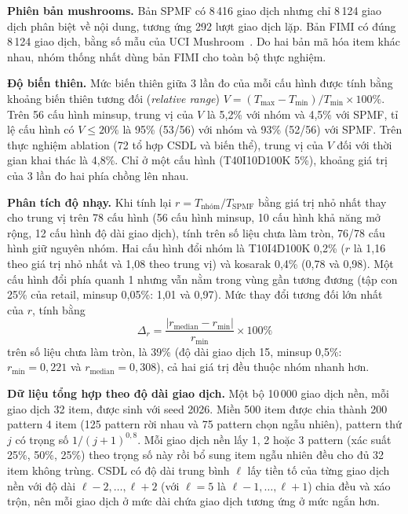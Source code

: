 \textbf{Phiên bản mushrooms.} Bản SPMF có 8\,416 giao dịch nhưng chỉ 8\,124 giao dịch phân biệt về nội dung, tương
ứng 292 lượt giao dịch lặp. Bản FIMI có đúng 8\,124 giao dịch, bằng số mẫu của UCI Mushroom~\cite{uci_mushroom}. Do
hai bản mã hóa item khác nhau, nhóm thống nhất dùng bản FIMI cho toàn bộ thực nghiệm.

\textbf{Độ biến thiên.} Mức biến thiên giữa 3 lần đo của mỗi cấu hình được tính bằng khoảng biến thiên tương đối
(\textit{relative range}) $V=(T_{\max}-T_{\min})/T_{\min}\times 100\%$. Trên 56 cấu hình minsup, trung vị của $V$ là 5{,}2\% với nhóm và 4{,}5\% với SPMF, tỉ lệ cấu hình có $V \le 20\%$ là
95\% (53/56) với nhóm và 93\% (52/56) với SPMF. Trên thực nghiệm ablation (72 tổ hợp CSDL và biến thể), trung vị của
$V$ đối với thời gian khai thác là 4{,}8\%. Chỉ ở một cấu hình (T40I10D100K 5\%), khoảng giá trị của 3 lần đo hai
phía chồng lên nhau.

\textbf{Phân tích độ nhạy.} Khi tính lại $r = T_{\text{nhóm}}/T_{\text{SPMF}}$ bằng giá trị nhỏ nhất thay cho
trung vị trên 78 cấu hình (56 cấu hình minsup, 10 cấu hình khả năng mở rộng, 12 cấu hình độ dài giao dịch), tính trên
số liệu chưa làm tròn, 76/78 cấu hình giữ nguyên nhóm. Hai cấu hình đổi nhóm là T10I4D100K 0{,}2\% ($r$ là 1{,}16 theo
giá trị nhỏ nhất và 1{,}08 theo trung vị) và kosarak 0{,}4\% (0{,}78 và 0{,}98). Một cấu hình đổi phía quanh 1 nhưng
vẫn nằm trong vùng gần tương đương (tập con 25\% của retail, minsup 0{,}05\%: 1{,}01 và 0{,}97). Mức thay đổi tương đối
lớn nhất của $r$, tính bằng
\begin{equation}
\Delta_r = \frac{|r_{\text{median}}-r_{\min}|}{r_{\min}}\times 100\%
\end{equation}
trên số liệu chưa làm tròn, là 39\% (độ dài giao dịch 15, minsup 0{,}5\%: $r_{\min}=0{,}221$ và
$r_{\text{median}}=0{,}308$), cả hai giá trị đều thuộc nhóm nhanh hơn.

\textbf{Dữ liệu tổng hợp theo độ dài giao dịch.} Một bộ 10\,000 giao dịch nền, mỗi giao dịch 32 item, được sinh với
seed 2026. Miền 500 item được chia thành 200 pattern 4 item (125 pattern rời nhau và 75 pattern chọn ngẫu nhiên),
pattern thứ $j$ có trọng số $1/(j+1)^{0{,}8}$. Mỗi giao dịch nền lấy 1, 2 hoặc 3 pattern (xác suất 25\%, 50\%, 25\%)
theo trọng số này rồi bổ sung item ngẫu nhiên đều cho đủ 32 item không trùng. CSDL có độ dài trung bình $\ell$ lấy
tiền tố của từng giao dịch nền với độ dài $\ell-2, \ldots, \ell+2$ (với $\ell=5$ là $\ell-1, \ldots, \ell+1$) chia đều
và xáo trộn, nên mỗi giao dịch ở mức dài chứa giao dịch tương ứng ở mức ngắn hơn.

